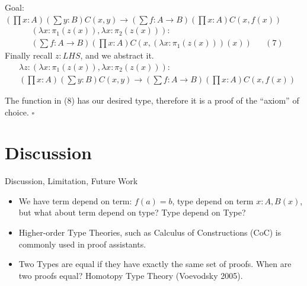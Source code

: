 \documentclass{beamer}
\theoremstyle{plain}
\begin{document}
\begin{frame}{Goal: $(\prod x: A)(\sum {y: B})C(x, y)\to(\sum{f: A\to B})(\prod{x: A})C(x, f(x))$}
      \begin{align*}
        &(\lambda x: \pi_{1}(z(x)), \lambda x:\pi_{2}(z(x))):\nonumber\\
        &(\sum f:A\to B)(\prod x:A)C(x, (\lambda x:\pi_{1}(z(x)))(x))&&(7)
      \end{align*}
    Finally recall $z: LHS$, and we abstract it.
    \begin{align}
    &\lambda z: (\lambda x: \pi_{1}(z(x)), \lambda x:\pi_{2}(z(x))):\nonumber\\
    &(\prod x: A)(\sum {y: B})C(x, y)\to(\sum{f: A\to B})(\prod{x: A})C(x, f(x))
    \end{align}

    The function in (8) has our desired type, therefore it is a proof of the
    ``axiom'' of choice. $\square$
\end{frame}

\section{Discussion}
\begin{frame}{Discussion, Limitation, Future Work}
\begin{itemize}
  \item We have term depend on term: $f(a) = b$, type depend on term
        $x: A, B(x)$, but what about term depend on type? Type depend on Type?
        \pause
  \item Higher-order Type Theories, such as Calculus of Constructions (CoC) is
        commonly used in proof assistants.
        \pause
    \item Two Types are equal if they have exactly the same set of proofs. When
    are two proofs equal? \pause Homotopy Type Theory (Voevodsky 2005).
\end{itemize}
\end{frame}

\end{document}
